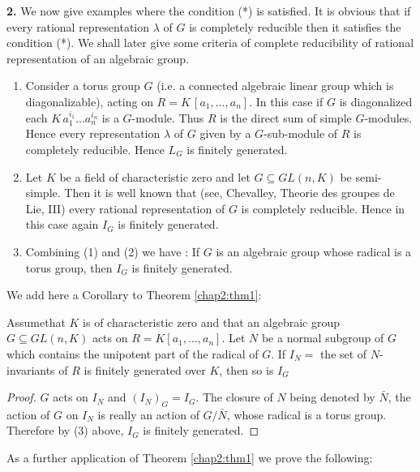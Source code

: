 \medskip
\noindent
{\bf 2.} \quad We now give examples where the condition (*) is satisfied. It is
obvious that if every rational representation $\lambda$ of $G$ is
completely reducible then it satisfies the condition (*). We shall
later give some criteria of complete reducibility of rational
representation of an algebraic group.  
\begin{enumerate}[(1)]
\item Consider a torus group $G$ (i.e. a connected algebraic linear
  group which is diagonalizable), acting on $R = K \, [a_1, \ldots ,
    a_n]$. In this case if $G$ is diagonalized each $K \, a^{i_{1}}_1
  \ldots a^{i_{n}}_n $ is a $G$-module. Thus $R$ is the direct sum of
  simple $G$-modules. Hence every representation $ \lambda $ of $G$
  given by a $G$-sub-module of $R$ is completely reducible. Hence
  $L_G$ is finitely generated.  

\item Let $K$ be a field of characteristic zero and let $G \subseteq
  GL (n, K)$ be semi-simple. Then it is well known that (see,
  Chevalley, Theorie des groupes de Lie, III) every rational
  representation of $G$ is completely reducible. Hence in this case
  again $I_G$ is finitely generated.  

\item Combining (1) and (2) we have : If $G$ is an algebraic group
  whose radical is a torus group, then $I_G$ is finitely generated.           
\end{enumerate}

We add here a Corollary to Theorem \ref{chap2:thm1}:  

\begin{coro*}
 Assume\pageoriginale that $K$ is of characteristic zero and that an
 algebraic group 
 $G \subseteq GL (n, K) $ acts on $R = K   [a_1 ,\ldots , a_n]$. Let
 $N$ be a normal subgroup of $G$ which contains the unipotent part of
 the radical of $G$. If $ I_N = $ the set of $N$-invariants of $R$ is
 finitely generated over $K$, then so is $I_G$  
\end{coro*}

\begin{proof}
 $G$ acts on $I_N$ and $(I_N)_G  = I_G$. The closure of $N$ being
  denoted by $\bar{N}$, the action of $G$ on $I_N$ is really an action
  of $ G/ \bar{N}$, whose radical is a torus group. Therefore by (3)
  above, $I_G$ is finitely generated. 
\end{proof}

As a further application of Theorem \ref{chap2:thm1} we prove the following:

